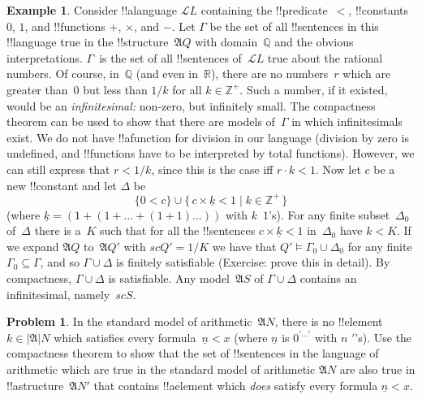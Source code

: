 \documentclass[10pt,a4paper]{article}
\theoremstyle{plain}
\theoremstyle{definition}
\newtheorem{ex}[thm]{Example}
\newtheorem{prob}{Problem}[section]
\theoremstyle{remark}
\providecommand{\Obj}{}
\providecommand{\Struct}{\ensuremath{\mathfrak{A}}}
\providecommand{\Domain}{\ensuremath{|\mathfrak{A}|}}
\providecommand{\Assign}{\ensuremath{s}}
\providecommand{\Sat}[2]{\ensuremath{#1 \models #2}}
\providecommand{\Lang}{\ensuremath{\mathcal{L}}}
\providecommand{\num}[1]{\underline{#1}}
\providecommand{\Rat}{\mathbb{Q}}
\providecommand{\Real}{\mathbb{R}}
\providecommand{\PosInt}{\mathbb{Z}^{+}}
\providecommand{\Setabs}[2]{\{\, #1 \mid #2 \,\}}
\begin{document}
{\begin{ex}
Consider !!a{language} $\Lang{L}$ containing the !!{predicate}~$<$,
!!{constant}s $\Obj{0}$, $\Obj{1}$, and !!{function}s $+$, $\times$, and
$-$. Let $\Gamma$ be the set of all !!{sentence}s in this
!!{language} true in the !!{structure}~$\Struct{Q}$ with domain~$\Rat$ and the obvious
interpretations.  $\Gamma$~is the set of all !!{sentence}s
of~$\Lang{L}$ true about the rational numbers. Of course, in~$\Rat$
(and even in~$\Real$), there are no numbers~$r$ which are greater than~$0$
but less than $1/k$ for all $k \in \PosInt$.  Such a number, if it
existed, would be an \emph{infinitesimal:} non-zero, but infinitely
small.  The compactness theorem can be used to show that there are 
models of~$\Gamma$ in which infinitesimals exist. We do not have 
!!a{function} for division in our language (division by zero is 
undefined, and !!{function}s have to be interpreted by total functions).
However, we can still express that $r < 1/k$, since this is the case iff
$r \cdot k < 1$. Now let $c$ be a new !!{constant} and let $\Delta$ be 
\[
\{\Obj{0} < c\}
\cup \Setabs{ c \times \num k < \Obj{1} }{k \in \PosInt}
\]
(where $\num{k} = (\Obj{1} + (\Obj{1} + \dots + (\Obj{1} +
\Obj{1})\dots))$ with $k$~$\Obj{1}$'s). For any finite
subset~$\Delta_0$ of~$\Delta$ there is a~$K$ such that for all the
!!{sentence}s $c \times \num{k} < \Obj{1}$ in~$\Delta_0$ have $k < K$.
If we expand $\Struct{Q}$ to~$\Struct{Q'}$ with $\Assign{c}{Q'} = 1/K$
we have that $\Sat{Q'}{\Gamma_0 \cup \Delta_0}$ for any finite
$\Gamma_0 \subseteq \Gamma$, and so $\Gamma \cup \Delta$ is finitely
satisfiable (Exercise: prove this in detail). By compactness, $\Gamma
\cup \Delta$ is satisfiable. Any model~$\Struct{S}$ of $\Gamma \cup
\Delta$ contains an infinitesimal, namely~$\Assign{c}{S}$.
\end{ex}
}{}

\begin{prob}
In the standard model of arithmetic~$\Struct{N}$, there is no
!!{element}~$k \in \Domain{N}$ which satisfies every formula~$\num{n}
< x$ (where $\num{n}$ is $\Obj{0}^{\prime\dots\prime}$ with $n$
$\prime$'s).  Use the compactness theorem to show that the set of
!!{sentence}s in the language of arithmetic which are true in the standard
model of arithmetic $\Struct{N}$ are also true in
!!a{structure}~$\Struct{N'}$ that contains !!a{element} which
\emph{does} satisfy every formula $\num{n} < x$.
\end{prob}
\tagendprob
\end{document}
